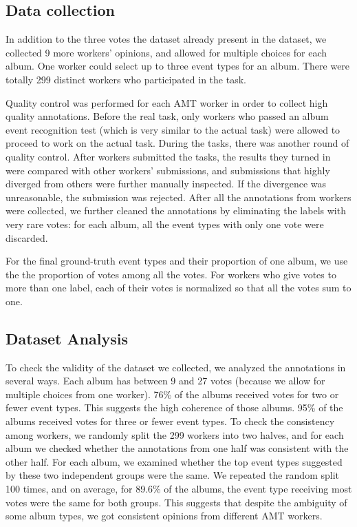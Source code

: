 \documentclass[runningheads]{llncs}
\begin{document}
\subsection{Data collection}
In addition to the three votes the dataset already present in the dataset, we collected 9 more workers' opinions, and allowed for multiple choices for each album. One worker could select up to three event types for an album. There were totally 299 distinct workers who participated in the task.

Quality control was performed for each AMT worker in order to collect high quality annotations. Before the real task, only workers who passed an album event recognition test (which is very similar to the actual task) were allowed to proceed to work on the actual task. During the tasks, there was another round of quality control. After workers submitted the tasks, the results they turned in were compared with other workers' submissions, and submissions that highly diverged from others were further manually inspected. If the divergence was unreasonable, the submission was rejected. After all the annotations from workers were collected, we further cleaned the annotations by eliminating the labels with very rare votes: for each album, all the event types with only one vote were discarded. 

For the final ground-truth event types and their proportion of one album, we use the the proportion of votes among all the votes. For workers who give votes to more than one label, each of their votes is normalized so that all the votes sum to one.

\subsection{Dataset Analysis}
To check the validity of the dataset we collected, we analyzed the annotations in several ways. Each album has between 9 and 27 votes (because we allow for multiple choices from one worker). 76\% of the albums received votes for two or fewer event types. This suggests the high coherence of those albums. 95\% of the albums received votes for three or fewer event types.  To check the consistency among workers, we randomly split the 299 workers into two halves, and for each album we checked whether the annotations from one half was consistent with the other half. For each album, we examined whether the top event types suggested by these two independent groups were the same.
We repeated the random split 100 times, and on average, for 89.6\% of the albums, the event type receiving most votes were the same for both groups. This suggests that despite the ambiguity of some album types, we got consistent opinions from different AMT workers. 
\end{document}
